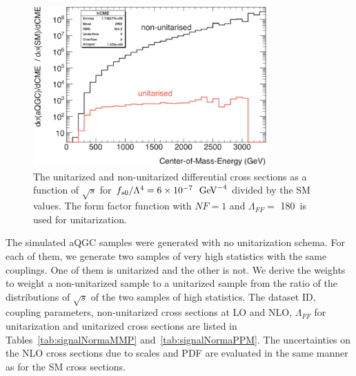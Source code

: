\begin{figure}[htp]
  \centering
  \includegraphics[width=0.8\textwidth]{figures/signal_section/Unitarity_check.eps}  
  \caption{The unitarized and non-unitarized differential cross
    sections as a function of $\sqrt{s}$ for $f_{s0}/\Lambda^4
    = 6\times 10^{-7}~\GeV^{-4}$ divided by the SM values. The
    form factor function with $NF=1$ and $\Lambda_{FF} =$ 180~\GeV is
    used for unitarization.  }
\label{fig:unitaritycheck}
\end{figure}
The simulated aQGC samples were generated with no unitarization schema. For
each of them, we generate two samples of very high statistics with the
same couplings. One of them is unitarized and the other is not. We
derive the weights to weight a non-unitarized sample to a unitarized
sample from the ratio of the distributions of $\sqrt{s}$ of the two
samples of high statistics. The dataset ID, coupling parameters,
non-unitarized cross sections at LO and NLO, $\Lambda_{FF}$ for
unitarization and unitarized cross sections are listed in
Tables~\ref{tab:signalNormaMMP} and~\ref{tab:signalNormaPPM}. The uncertainties on the NLO cross
sections due to scales and PDF are evaluated in the same manner as for
the SM cross sections.
